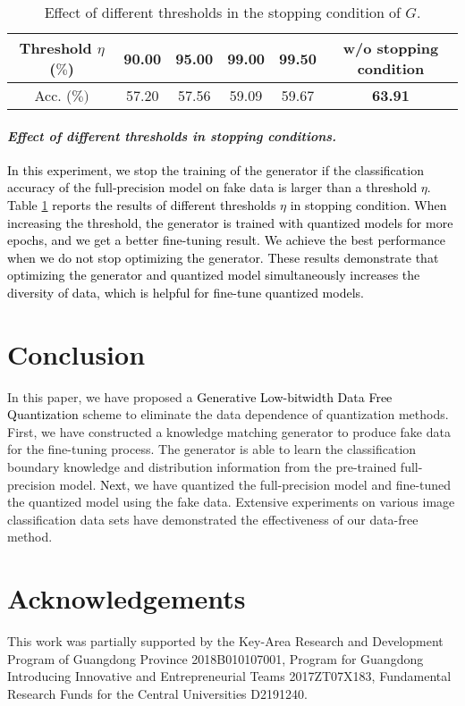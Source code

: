 \documentclass[runningheads]{llncs}
\def\mytitle{\textcolor{black}{Generative Low-bitwidth Data Free Quantization }}
\def\lhk{\textcolor{black}}
\def\new{\textcolor{black}}
\begin{document}
\begin{table}[t]
\tabcolsep=8pt
\begin{center}
\caption{Effect of different thresholds in the stopping condition of $G$.}
\label{tb:early_stop_G}
\begin{tabular}{cccccc}
\hline
Threshold $\eta$ ($\%$) & 90.00 & 95.00 & 99.00 & 99.50 & w/o stopping condition \\ 
\hline
Acc. ($\%)$ & 57.20 & 57.56 & 59.09 & 59.67 & \textbf{63.91} \\
\hline
\end{tabular}
\end{center}
\end{table}
\paragraph{\emph{\textbf{Effect of different thresholds in stopping conditions.}}}


\lhk{In this experiment, we stop the training of the generator if the classification accuracy of the full-precision model on fake data is larger than a threshold $\eta$. Table \ref{tb:early_stop_G} reports the results of different thresholds $\eta$ in stopping condition. When increasing the threshold, the generator is trained with quantized models for more epochs, and we get a better fine-tuning result. \new{We} achieve the best performance when we do not stop optimizing the generator. These results demonstrate that optimizing the generator and quantized model simultaneously increases the diversity of data, which is helpful for fine-tune quantized models.}


\section{Conclusion}
In this paper, we have proposed a \mytitle scheme to eliminate the data dependence of quantization methods. 
First, we have constructed a knowledge matching generator to produce fake data for the fine-tuning process. 
The generator is able to learn the classification boundary knowledge and distribution information from the pre-trained full-precision model.
\new{Next,} we have quantized the full-precision model and fine-tuned the quantized model using the fake data.
Extensive experiments on various image classification data sets have demonstrated the effectiveness of our data-free method.

\section*{Acknowledgements}
This work was partially supported by the Key-Area Research and Development Program of Guangdong Province 2018B010107001, Program for Guangdong Introducing Innovative and Entrepreneurial Teams 2017ZT07X183, Fundamental Research Funds for the Central Universities D2191240.
\end{document}
